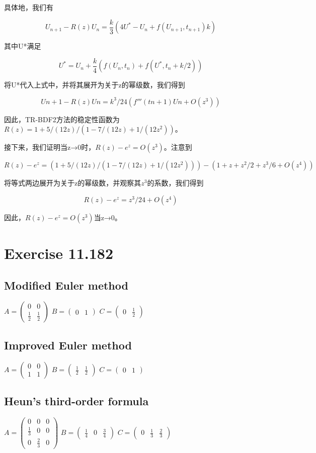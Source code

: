 \documentclass[twoside,a4paper]{article}
\begin{document}
具体地，我们有

$$U_{n+1} - R(z)U_n = \frac{k}{3}(4U^* - U_n + f(U_{n+1}, t_{n+1})k)$$

其中U*满足

$$U^* = U_n + \frac{k}{4}(f(U_n, t_n) + f(U^*, t_n + k/2))$$

将U*代入上式中，并将其展开为关于z的幂级数，我们得到

$$Un+1 - R(z)Un = k^3/24 (f'''(tn+1)Un + O(z^3))$$

因此，TR-BDF2方法的稳定性函数为$R(z)=1+5/(12z)/(1-7/(12z)+1/(12z^2))$。

接下来，我们证明当z→0时，$R(z)-e^z=O(z^3)$。注意到

$$R(z)-e^z = (1+5/(12z)/(1-7/(12z)+1/(12z^2))) - (1+z+z^2/2+z^3/6+O(z^4))$$

将等式两边展开为关于z的幂级数，并观察其$z^3$的系数，我们得到

$$R(z)-e^z = z^3/24 + O(z^4)$$

因此，$R(z)-e^z=O(z^3)$当z→0。
\section{Exercise 11.182}
\subsection{Modified Euler method}
$A=\begin{pmatrix}
    0& 0\\
    \frac{1}{2} & \frac{1}{2} 
   \end{pmatrix}$
   $B=\begin{pmatrix}
    0 &1
   \end{pmatrix}$
   $C=\begin{pmatrix}
    0 &\frac{1}{2}
   \end{pmatrix}$
\subsection{Improved Euler method}
$A=\begin{pmatrix}
    0& 0\\
    1 & 1 
   \end{pmatrix}$
   $B=\begin{pmatrix}
    \frac{1}{2} &\frac{1}{2}
   \end{pmatrix}$
   $C=\begin{pmatrix}
    0 &1
   \end{pmatrix}$
\subsection{Heun’s third-order formula}
$A=\begin{pmatrix}
    0& 0 & 0\\
    \frac{1}{3} & 0& 0 \\
    0& \frac{2}{3}& 0 
   \end{pmatrix}$
   $B=\begin{pmatrix}
    \frac{1}{4} &0 &\frac{3}{4}
   \end{pmatrix}$
   $C=\begin{pmatrix}
    0 &\frac{1}{3}&\frac{2}{3}
   \end{pmatrix}$
\end{document}
